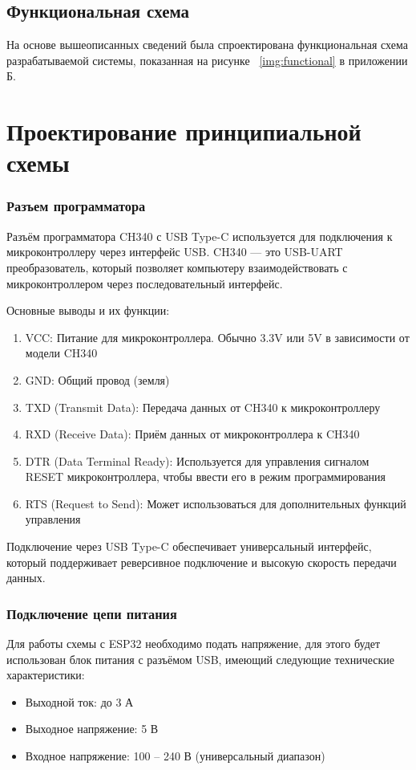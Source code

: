 \documentclass{bmstu}
\begin{document}
    \subsection{Функциональная схема}
    На основе вышеописанных сведений была спроектирована функциональная схема разрабатываемой системы,
    показанная на рисунке ~\ref{img:functional} в приложении Б.

    
    \section{Проектирование принципиальной схемы}
    
    \subsubsection{Разъем программатора}
    Разъём программатора CH340 с USB Type-C используется для подключения к микроконтроллеру через интерфейс USB.
    CH340 — это USB-UART преобразователь, который позволяет компьютеру взаимодействовать с микроконтроллером через последовательный интерфейс.

    Основные выводы и их функции:
    \begin{enumerate}
        \item VCC: Питание для микроконтроллера. Обычно 3.3V или 5V в зависимости от модели CH340
        \item GND: Общий провод (земля)
        \item TXD (Transmit Data): Передача данных от CH340 к микроконтроллеру
        \item RXD (Receive Data): Приём данных от микроконтроллера к CH340
        \item DTR (Data Terminal Ready): Используется для управления сигналом RESET микроконтроллера, чтобы ввести его в режим программирования
        \item RTS (Request to Send): Может использоваться для дополнительных функций управления
    \end{enumerate}

    Подключение через USB Type-C обеспечивает универсальный интерфейс,
    который поддерживает реверсивное подключение и высокую скорость передачи данных.

    \subsubsection{Подключение цепи питания}

    Для работы схемы с ESP32 необходимо подать напряжение, для этого будет использован блок питания с разъёмом USB,
    имеющий следующие технические характеристики:
    \begin{itemize}
        \item Выходной ток: до 3 А
        \item Выходное напряжение: 5 В
        \item Входное напряжение: 100 – 240 В (универсальный диапазон)
    \end{itemize}
\end{document}
